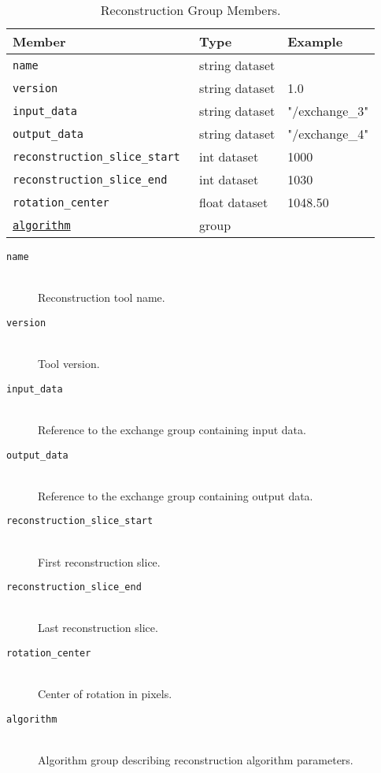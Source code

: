 \begin{table}[h!]\sffamily \footnotesize
\caption{Reconstruction Group Members.}
\centering
{}
\begin{tabular}{l l l}

\toprule
\bfseries Member     & \bfseries Type & \bfseries Example \\
\midrule
\tt{name} & string dataset &  \\  
\tt{version}  & string dataset  & 1.0 \\
\tt{input\_data} &  string dataset & "/exchange\_3" \\
\tt{output\_data} & string dataset & "/exchange\_4" \\
\tt{reconstruction\_slice\_start} & int dataset &  1000\\
\tt{reconstruction\_slice\_end} & int dataset &  1030\\
\tt{rotation\_center} & float dataset & 1048.50 \\
\hyperref[table:algorithm]{\tt{algorithm}} & group &  \\
\bottomrule
\end{tabular}
\end{table}

\begin{description}

\item[\tt{name}] \hfill \\
{Reconstruction tool name.}

\item[\tt{version}] \hfill \\
{Tool version.}

\item[\tt{input\_data}] \hfill \\
{Reference to the exchange group containing input data.}

\item[\tt{output\_data}] \hfill \\
{Reference to the exchange group containing output data.}

\item[\tt{reconstruction\_slice\_start}] \hfill \\
{First reconstruction slice.}

\item[\tt{reconstruction\_slice\_end}] \hfill \\
{Last reconstruction slice.}

\item[\tt{rotation\_center}] \hfill \\
{Center of rotation in pixels.}

\item[\tt{algorithm}] \hfill \\
{Algorithm group describing reconstruction algorithm parameters.}
\end{description}


